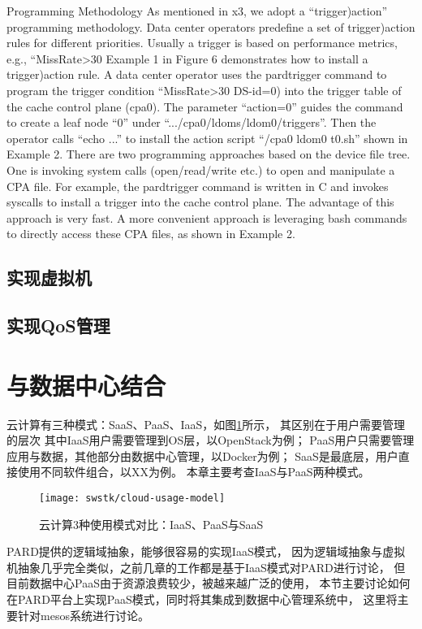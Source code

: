 Programming Methodology
As mentioned in x3, we adopt a “trigger)action” programming
methodology. Data center operators predefine a set of trigger)action
rules for different priorities. Usually a trigger is based on performance
metrics, e.g., “MissRate>30%
Example 1 in Figure 6 demonstrates how to install a trigger)action
rule. A data center operator uses the pardtrigger command to program
the trigger condition “MissRate>30%
DS-id=0) into the trigger table of the cache control plane (cpa0).
The parameter “action=0” guides the command to create a leaf
node “0” under “.../cpa0/ldoms/ldom0/triggers”. Then the operator
calls “echo ...” to install the action script “/cpa0 ldom0 t0.sh”
shown in Example 2.
There are two programming approaches based on the device file
tree. One is invoking system calls (open/read/write etc.) to open
and manipulate a CPA file. For example, the pardtrigger command
is written in C and invokes syscalls to install a trigger into the
cache control plane. The advantage of this approach is very fast. A
more convenient approach is leveraging bash commands to directly
access these CPA files, as shown in Example 2.


\subsection{实现虚拟机}


\subsection{实现QoS管理}


\section{与数据中心结合}

云计算有三种模式：SaaS、PaaS、IaaS，如图\ref{fig:cloud-usage-model}所示，
其区别在于用户需要管理的层次
其中IaaS用户需要管理到OS层，以OpenStack为例；
PaaS用户只需要管理应用与数据，其他部分由数据中心管理，以Docker为例；
SaaS是最底层，用户直接使用不同软件组合，以XX为例。
本章主要考查IaaS与PaaS两种模式。

\begin{figure}[tb]
  \centering
  \texttt{[image: swstk/cloud-usage-model]}
  \caption{云计算3种使用模式对比：IaaS、PaaS与SaaS}
  \label{fig:cloud-usage-model}
\end{figure}

PARD提供的逻辑域抽象，能够很容易的实现IaaS模式，
因为逻辑域抽象与虚拟机抽象几乎完全类似，之前几章的工作都是基于IaaS模式对PARD进行讨论，
但目前数据中心PaaS由于资源浪费较少，被越来越广泛的使用，
本节主要讨论如何在PARD平台上实现PaaS模式，同时将其集成到数据中心管理系统中，
这里将主要针对mesos系统进行讨论。

